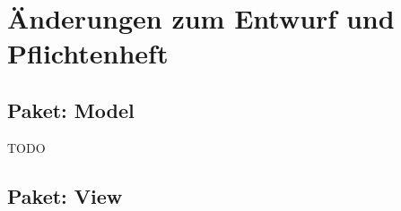 \documentclass[parskip=full,11pt,twoside]{scrartcl}
\begin{document}
\begin{minipage}{0.5\textwidth}
\begin{ganttchart}[x unit = 1.0cm, y unit chart = 0.7cm]{0}{4}
	\\
\\
\\
\\
\\
\\

\\
\\
\\
\\
\\
\\

\\
\\

\\
\end{ganttchart}
\end{minipage}

\section{Änderungen zum Entwurf und Pflichtenheft}

\subsection{Paket: Model}
TODO

\subsection{Paket: View}
\end{document}
